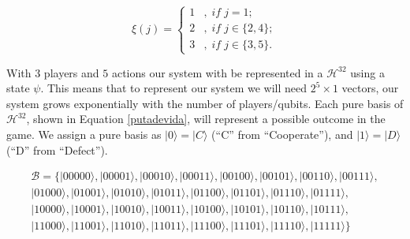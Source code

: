 \begin{equation}
\xi(j)=\begin{cases}
1 & ,\; if\; j=1;\\
2 & ,\; if\; j\in\{2,4\};\\
3 & ,\; if\; j\in\{3,5\}.
\end{cases}
\label{playerxiximapping}
\end{equation}


With $3$ players and $5$ actions our system with be represented in a $\mathcal{H}^{32}$ using a state $\psi$. This means that to represent our system we will need $2^{5}\times 1$ vectors, our system grows exponentially with the number of players/qubits. Each pure basis  of $\mathcal{H}^{32}$, shown in Equation \ref{putadevida}, will represent a possible outcome in the game. We assign a pure basis as $\vert 0\rangle = \vert C\rangle$ (``C'' from ``Cooperate''), and $\vert 1\rangle = \vert D\rangle$ (``D'' from ``Defect''). 


\begin{equation}
\begin{split}
\mathcal{B}= \{ \vert 00000\rangle , \vert 00001\rangle , \vert 00010\rangle , \vert 00011\rangle , \vert 00100\rangle , \vert 00101\rangle , \vert 00110\rangle , \vert 00111\rangle, \\
 \vert 01000\rangle , \vert 01001\rangle , \vert 01010\rangle , \vert 01011\rangle , \vert 01100\rangle , \vert 01101\rangle , \vert 01110\rangle , \vert 01111\rangle, \\
 \vert 10000\rangle , \vert 10001\rangle , \vert 10010\rangle , \vert 10011\rangle , \vert 10100\rangle , \vert 10101\rangle , \vert 10110\rangle , \vert 10111\rangle, \\
 \vert 11000\rangle , \vert 11001\rangle , \vert 11010\rangle , \vert 11011\rangle , \vert 11100\rangle , \vert 11101\rangle , \vert 11110\rangle , \vert 11111\rangle \}
\end{split}
\label{putadevida}
\end{equation}





